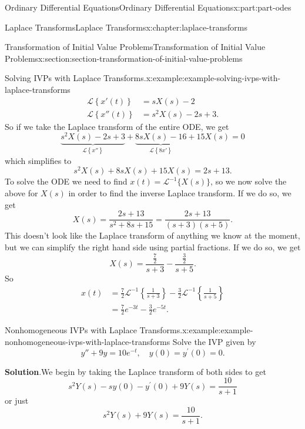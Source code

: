 \documentclass[oneside,10pt,]{book}
\newcommand{\blocktitlefont}{\relax}
\numberwithin{equation}{part}
\newcommand{\Laplace}[1]{\mathcal{L}\left\{#1\right\}}
\newcommand{\amp}{&}
\begin{document}
\begin{partptx}{Ordinary Differential Equations}{}{Ordinary Differential Equations}{}{}{x:part:part-odes}
\begin{chapterptx}{Laplace Transforms}{}{Laplace Transforms}{}{}{x:chapter:laplace-transforms}
\begin{sectionptx}{Transformation of Initial Value Problems}{}{Transformation of Initial Value Problems}{}{}{x:section:section-transformation-of-initial-value-problems}
\begin{example}{Solving IVPs with Laplace Transforms.}{x:example:example-solving-ivps-with-laplace-transforms}
\begin{align*}
\Laplace{x'(t)} \amp= sX(s) - 2\\
\Laplace{x''(t)} \amp= s^{2}X(s) - 2s +3\text{.}
\end{align*}
So if we take the Laplace transform of the entire ODE, we get%
\begin{equation*}
\underbrace{s^{2}X(s) - 2s + 3}_{\Laplace{x''}} + \underbrace{8sX(s) - 16}_{\Laplace{8x'}} + 15X(s) = 0
\end{equation*}
which simplifies to%
\begin{equation*}
s^{2}X(s)+8sX(s)+15X(s) = 2s+13.
\end{equation*}
To solve the ODE we need to find \(x(t) = \mathcal{L}^{-1}\{X(s)\}\), so we now solve the above for \(X(s)\) in order to find the inverse Laplace transform. If we do so, we get%
\begin{equation*}
X(s) = \frac{2s+13}{s^{2}+8s+15} = \frac{2s+13}{(s+3)(s+5)}.
\end{equation*}
This doesn't look like the Laplace transform of anything we know at the moment, but we can simplify the right hand side using partial fractions. If we do so, we get%
\begin{equation*}
X(s) = \frac{\frac{7}{2}}{s+3} - \frac{\frac{3}{2}}{s+5}.
\end{equation*}
So%
\begin{align*}
x(t) \amp= \frac{7}{2}\mathcal{L}^{-1}\left\{\frac{1}{s+3}\right\} - \frac{3}{2}\mathcal{L}^{-1}\left\{\frac{1}{s+5}\right\}\\
\amp= \frac{7}{2}e^{-3t} - \frac{3}{2}e^{-5t}\text{.}
\end{align*}
%
\end{example}
\begin{example}{Nonhomogeneous IVPs with Laplace Transforms.}{x:example:example-nonhomogeneous-ivps-with-laplace-transforms}%
Solve the IVP given by%
\begin{equation*}
y''+9y = 10e^{-t},\quad y(0) = y^\prime(0) = 0.
\end{equation*}
%
\par\smallskip%
\noindent\textbf{\blocktitlefont Solution}.\hypertarget{g:solution:idp105548781405344}{}\quad{}We begin by taking the Laplace transform of both sides to get%
\begin{equation*}
s^{2}Y(s) - sy(0) - y^\prime(0) + 9Y(s) = \frac{10}{s+1}
\end{equation*}
or just%
\begin{equation*}
s^{2}Y(s) + 9Y(s) = \frac{10}{s+1}.

\end{equation*}
\end{example}
\end{sectionptx}
\end{chapterptx}
\end{partptx}
\end{document}
